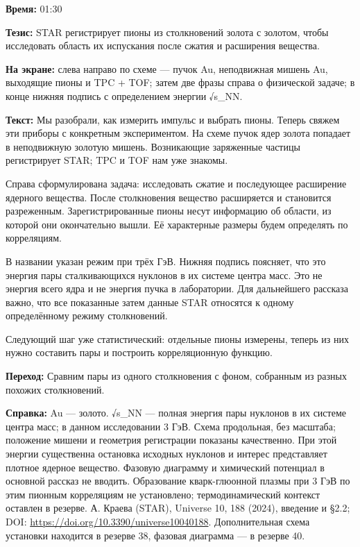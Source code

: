 \textbf{Время:} 01:30

\textbf{Тезис:} STAR регистрирует пионы из столкновений золота с золотом, чтобы исследовать область их испускания после сжатия и расширения вещества.

\textbf{На экране:} слева направо по схеме — пучок Au, неподвижная мишень Au, выходящие пионы и TPC + TOF; затем две фразы справа о физической задаче; в конце нижняя подпись с определением энергии √s\_NN.

\textbf{Текст:} Мы разобрали, как измерить импульс и выбрать пионы. Теперь свяжем эти приборы с конкретным экспериментом. На схеме пучок ядер золота попадает в неподвижную золотую мишень. Возникающие заряженные частицы регистрирует STAR; TPC и TOF нам уже знакомы.

Справа сформулирована задача: исследовать сжатие и последующее расширение ядерного вещества. После столкновения вещество расширяется и становится разреженным. Зарегистрированные пионы несут информацию об области, из которой они окончательно вышли. Её характерные размеры будем определять по корреляциям.

В названии указан режим при трёх ГэВ. Нижняя подпись поясняет, что это энергия пары сталкивающихся нуклонов в их системе центра масс. Это не энергия всего ядра и не энергия пучка в лаборатории. Для дальнейшего рассказа важно, что все показанные затем данные STAR относятся к одному определённому режиму столкновений.

Следующий шаг уже статистический: отдельные пионы измерены, теперь из них нужно составить пары и построить корреляционную функцию.

\textbf{Переход:} Сравним пары из одного столкновения с фоном, собранным из разных похожих столкновений.

\textbf{Справка:} Au — золото. √s\_NN — полная энергия пары нуклонов в их системе центра масс; в данном исследовании 3 ГэВ. Схема продольная, без масштаба; положение мишени и геометрия регистрации показаны качественно. При этой энергии существенна остановка исходных нуклонов и интерес представляет плотное ядерное вещество. Фазовую диаграмму и химический потенциал в основной рассказ не вводить. Образование кварк-глюонной плазмы при 3 ГэВ по этим пионным корреляциям не установлено; термодинамический контекст оставлен в резерве. А. Краева (STAR), Universe 10, 188 (2024), введение и §2.2; DOI: \url{https://doi.org/10.3390/universe10040188}. Дополнительная схема установки находится в резерве 38, фазовая диаграмма — в резерве 40.
